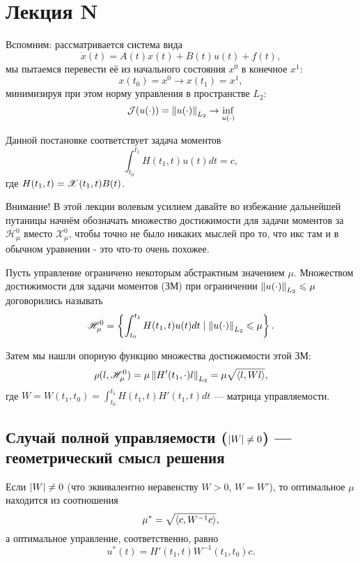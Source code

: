 \chapter{Лекция N}
Вспомним: рассматривается система вида
\begin{equation}
    \dot{x}(t) = A(t) x(t) + B(t) u (t) + f(t),
\end{equation}
мы пытаемся перевести её из начального состояния $x^0$ в конечное $x^1$:
\begin{equation}
    x(t_0) = x^0 \to x(t_1) = x^1,
\end{equation}
минимизируя при этом норму управления в пространстве $L_2$:
\begin{equation}
    \mathcal{J}(u(\cdot)) = \left\lVert u(\cdot) \right\rVert_{L_2} \to \inf\limits_{u(\cdot)}
\end{equation}

Данной постановке соответствует задача моментов
\begin{equation}\tag{ЗМ}
    \int_{t_0}^{t_1} H(t_1, t) u(t) dt = c,
\end{equation}
где $H(t_1, t) = \mathscr{X}(t_1, t) B(t)$.

Внимание! В этой лекции волевым усилием давайте во избежание дальнейшей путаницы начнём обозначать множество достижимости для задачи моментов за $\mathscr{H}_{\mu}^0$ вместо $\mathscr{X}_{\mu}^0$, чтобы точно не было никаких мыслей про то, что икс там и в обычном уравнении - это что-то очень похожее.

Пусть управление ограничено некоторым абстрактным значением $\mu$. Множеством достижимости для задачи моментов (ЗМ) при ограничении $\left\lVert u(\cdot) \right\rVert_{L_2} \leqslant \mu$ договорились называть
\begin{equation}
    \mathscr{H}_{\mu}^0 = \left\{ \int_{t_0}^{t_1} H(t_1, t) u(t) dt \mid \left\lVert u(\cdot) \right\rVert_{L_2} \leqslant \mu \right\}.
\end{equation}

Затем мы нашли опорную функцию множества достижимости этой ЗМ:
$$
\rho(l, \mathscr{H}_{\mu}^0) = \mu \left\lVert H'(t_1, \cdot)l \right\rVert_{L_2} = \mu \sqrt{\left < l, Wl \right >},
$$
где $W = W(t_1, t_0) = \int_{t_0}^{t_1} H(t_1, t) H'(t_1, t) dt$ --- матрица управляемости.

\section{Случай полной управляемости ($\left\lvert W \right\rvert \neq 0$) --- геометрический смысл решения}
Если $\left\lvert W \right\rvert \neq 0$ (что эквивалентно неравенству $W > 0$, $W = W'$), то оптимальное $\mu$ находится из соотношения
$$
\mu^* = \sqrt{\left < c, W^{-1}c \right >},
$$
а оптимальное управление, соответственно, равно
$$
u^*(t) = H'(t_1,t) W^{-1}(t_1, t_0) c.
$$

